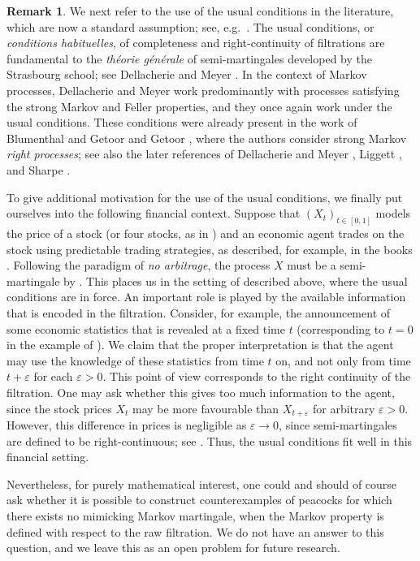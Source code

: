 \documentclass[12pt,oneside]{amsart}
\theoremstyle{definition}
\newtheorem{remark}[theorem]{Remark}
\numberwithin{equation}{section}
\begin{document}
\begin{remark}
	We next refer to the use of the usual conditions in the literature, which are now a standard assumption; see, e.g.~\cite{RoWi00}. The usual conditions, or \emph{conditions habituelles}, of completeness and right-continuity of filtrations are fundamental to the \emph{th\'eorie g\'en\'erale} of semi-martingales developed by the Strasbourg school; see Dellacherie and Meyer \cite{DMa,DMb}. In the context of Markov processes, Dellacherie and Meyer \cite{DMd} work predominantly with processes satisfying the strong Markov and Feller properties, and they once again work under the usual conditions. These conditions were already present in the work of Blumenthal and Getoor \cite{BlGe68} and Getoor \cite{Ge75}, where the authors consider strong Markov \emph{right processes}; see also the later references of Dellacherie and Meyer \cite{DMe}, Liggett \cite{Li10}, and Sharpe \cite{Sh88}.
	
	To give additional motivation for the use of the usual conditions, we finally put ourselves into the following financial context. Suppose that $(X_t)_{t \in [0, 1]}$ models the price of a stock (or four stocks, as in ) and an economic agent trades on the stock using predictable trading strategies, as described, for example, in the books \cite{DeSc06,KaSh98}. Following the paradigm of \emph{no arbitrage}, the process $X$ must be a semi-martingale by \cite[Theorem 9.7.2]{DeSc06}. This places us in the setting of \cite{DMb} described above, where the usual conditions are in force. An important role is played by the available information that is encoded in the filtration. Consider, for example, the announcement of some economic statistics that is revealed at a fixed time $t$ (corresponding to $t = 0$ in the example of ). We claim that the proper interpretation is that the agent may use the knowledge of these statistics from time $t$ on, and not only from time $t + \varepsilon$ for each $\varepsilon > 0$. This point of view corresponds to the right continuity of the filtration. One may ask whether this gives too much information to the agent, since the stock prices $X_t$ may be more favourable than $X_{t + \varepsilon}$ for arbitrary $\varepsilon > 0$. However, this difference in prices is negligible as $\varepsilon \to 0$, since semi-martingales are defined to be right-continuous; see \cite{DMb}. Thus, the usual conditions fit well in this financial setting.
	
	Nevertheless, for purely mathematical interest, one could and should of course ask whether it is possible to construct counterexamples of peacocks for which there exists no mimicking Markov martingale, when the Markov property is defined with respect to the raw filtration. We do not have an answer to this question, and we leave this as an open problem for future research.
\end{remark}
\end{document}
